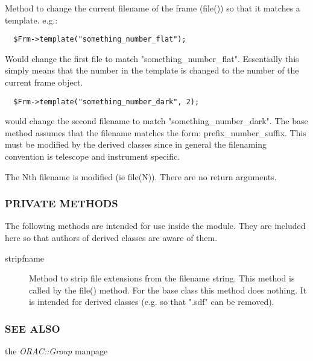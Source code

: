 \begin{description}
Method to change the current filename of the frame (file())
so that it matches a template. e.g.:

\begin{verbatim}
  $Frm->template("something_number_flat");
\end{verbatim}


Would change the first file to match "something\_number\_flat".
Essentially this simply means that the number in the template
is changed to the number of the current frame object.

\begin{verbatim}
  $Frm->template("something_number_dark", 2);
\end{verbatim}


would change the second filename to match "something\_number\_dark".
The base method assumes that the filename matches the form:
prefix\_number\_suffix. This must be modified by the derived
classes since in general the filenaming convention is telescope
and instrument specific.



The Nth filename is modified (ie file(N)).
There are no return arguments.

\end{description}
\subsubsection*{PRIVATE METHODS\label{ORAC::Frame_PRIVATE_METHODS}}

The following methods are intended for use inside the module.
They are included here so that authors of derived classes are 
aware of them.

\begin{description}
\item[stripfname] \mbox{}

Method to strip file extensions from the filename string. This method
is called by the file() method. For the base class this method
does nothing. It is intended for derived classes (e.g. so that ".sdf"
can be removed).

\end{description}
\subsubsection*{SEE ALSO\label{ORAC::Frame_SEE_ALSO}}

the \emph{ORAC::Group} manpage

